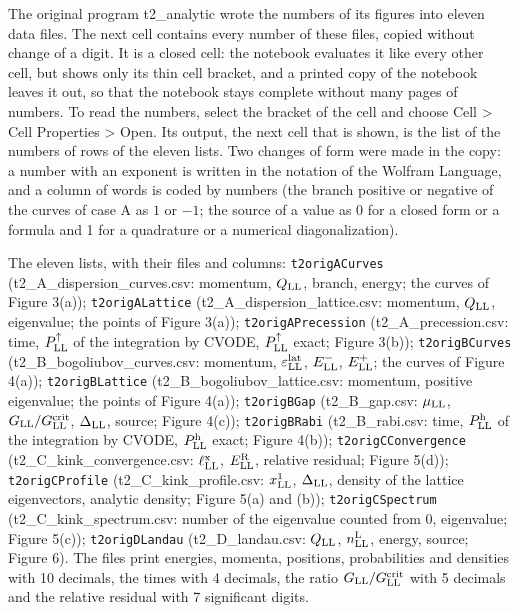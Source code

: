 \documentclass[
  10pt,
]{article}
\begin{document}
The original program t2\_analytic wrote the numbers of its figures into
eleven data files. The next cell contains every number of these files,
copied without change of a digit. It is a closed cell: the notebook
evaluates it like every other cell, but shows only its thin cell
bracket, and a printed copy of the notebook leaves it out, so that the
notebook stays complete without many pages of numbers. To read the
numbers, select the bracket of the cell and choose Cell \textgreater{}
Cell Properties \textgreater{} Open. Its output, the next cell that is
shown, is the list of the numbers of rows of the eleven lists. Two
changes of form were made in the copy: a number with an exponent is
written in the notation of the Wolfram Language, and a column of words
is coded by numbers (the branch positive or negative of the curves of
case A as \(1\) or \(-1\); the source of a value as 0 for a closed form
or a formula and 1 for a quadrature or a numerical diagonalization).

The eleven lists, with their files and columns: \texttt{t2origACurves}
(t2\_A\_dispersion\_curves.csv: momentum, \(Q_{\rm LL}\), branch,
energy; the curves of Figure 3(a)); \texttt{t2origALattice}
(t2\_A\_dispersion\_lattice.csv: momentum, \(Q_{\rm LL}\), eigenvalue;
the points of Figure 3(a)); \texttt{t2origAPrecession}
(t2\_A\_precession.csv: time, \(P^\uparrow_{\rm LL}\) of the integration
by CVODE, \(P^\uparrow_{\rm LL}\) exact; Figure 3(b));
\texttt{t2origBCurves} (t2\_B\_bogoliubov\_curves.csv: momentum,
\(\varepsilon^{\rm lat}_{\rm LL}\), \(E^-_{\rm LL}\), \(E^+_{\rm LL}\);
the curves of Figure 4(a)); \texttt{t2origBLattice}
(t2\_B\_bogoliubov\_lattice.csv: momentum, positive eigenvalue; the
points of Figure 4(a)); \texttt{t2origBGap} (t2\_B\_gap.csv:
\(\mu_{\rm LL}\), \(G_{\rm LL}/G^{\rm crit}_{\rm LL}\),
\(\Delta_{\rm LL}\), source; Figure 4(c)); \texttt{t2origBRabi}
(t2\_B\_rabi.csv: time, \(P^{\rm h}_{\rm LL}\) of the integration by
CVODE, \(P^{\rm h}_{\rm LL}\) exact; Figure 4(b));
\texttt{t2origCConvergence} (t2\_C\_kink\_convergence.csv:
\(\ell^{\rm x}_{\rm LL}\), \(E^{\rm R}_{\rm LL}\), relative residual;
Figure 5(d)); \texttt{t2origCProfile} (t2\_C\_kink\_profile.csv:
\(x^1_{\rm LL}\), \(\Delta_{\rm LL}\), density of the lattice
eigenvectors, analytic density; Figure 5(a) and (b));
\texttt{t2origCSpectrum} (t2\_C\_kink\_spectrum.csv: number of the
eigenvalue counted from 0, eigenvalue; Figure 5(c));
\texttt{t2origDLandau} (t2\_D\_landau.csv: \(Q_{\rm LL}\),
\(n^{\rm L}_{\rm LL}\), energy, source; Figure 6). The files print
energies, momenta, positions, probabilities and densities with 10
decimals, the times with 4 decimals, the ratio
\(G_{\rm LL}/G^{\rm crit}_{\rm LL}\) with 5 decimals and the relative
residual with 7 significant digits.
\end{document}
